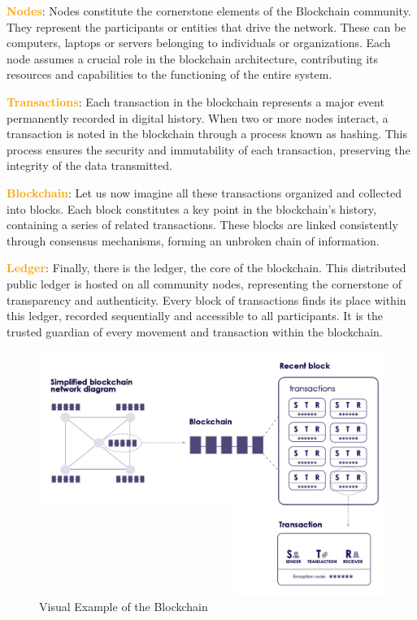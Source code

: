 \textbf{\textcolor{Orange}{Nodes}}: Nodes constitute the cornerstone elements of the Blockchain community. They represent the participants or entities that drive the network. These can be computers, laptops or servers belonging to individuals or organizations. Each node assumes a crucial role in the blockchain architecture, contributing its resources and capabilities to the functioning of the entire system.

\textbf{\textcolor{Orange}{Transactions}}: Each transaction in the blockchain represents a major event permanently recorded in digital history. When two or more nodes interact, a transaction is noted in the blockchain through a process known as hashing. This process ensures the security and immutability of each transaction, preserving the integrity of the data transmitted.

\textbf{\textcolor{Orange}{Blockchain}}: Let us now imagine all these transactions organized and collected into blocks. Each block constitutes a key point in the blockchain's history, containing a series of related transactions. These blocks are linked consistently through consensus mechanisms, forming an unbroken chain of information.

\textbf{\textcolor{Orange}{Ledger}}: Finally, there is the ledger, the core of the blockchain. This distributed public ledger is hosted on all community nodes, representing the cornerstone of transparency and authenticity. Every block of transactions finds its place within this ledger, recorded sequentially and accessible to all participants. It is the trusted guardian of every movement and transaction within the blockchain.

\begin{figure}[hb]
\centering\includegraphics[scale=0.3]{tikz/chapter2 - Blockchain.png}
\caption{Visual Example of the Blockchain \cite{blockchainFinyear}}
\end{figure}


